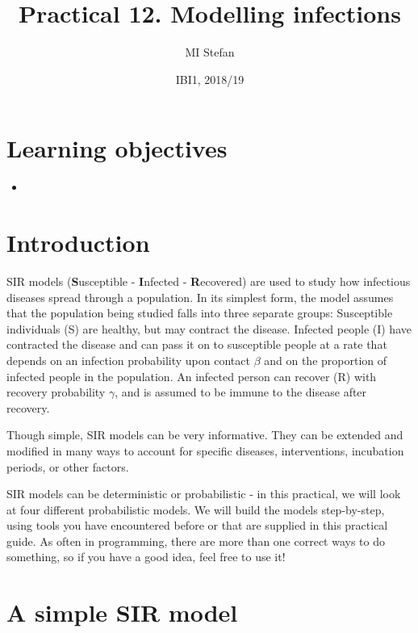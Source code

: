 \documentclass[pdflatex,a4paper]{article}
\title{Practical 12. Modelling infections}
\author{MI Stefan}
\date{IBI1, 2018/19}
\begin{document}
\newcommand{\<}{\textless}
\renewcommand{\>}{\textgreater}


\maketitle

\section{Learning objectives}

\begin{itemize}
\item

\end{itemize}

\section{Introduction}

SIR models (\textbf{S}usceptible - \textbf{I}nfected - \textbf{R}ecovered) are used to study how infectious diseases spread through a population. In its simplest form, the model assumes that the population being studied falls into three separate groups: Susceptible individuals (S) are healthy, but may contract the disease. Infected people (I) have contracted the disease and can pass it on to susceptible people at a rate that depends on an infection probability upon contact \(\beta\) and on the proportion of infected people in the population. An infected person can recover (R) with recovery probability \(\gamma\), and is assumed to be immune to the disease after recovery.  

Though simple, SIR models can be very informative. They can be extended and modified in many ways to account for specific diseases, interventions, incubation periods, or other factors. 

SIR models can be deterministic or probabilistic - in this practical, we will look at four different probabilistic models. We will build the models step-by-step, using tools you have encountered before or that are supplied in this practical guide. As often in programming, there are more than one correct ways to do something, so if you have a good idea, feel free to use it!


\section{A simple SIR model}
\end{document}
